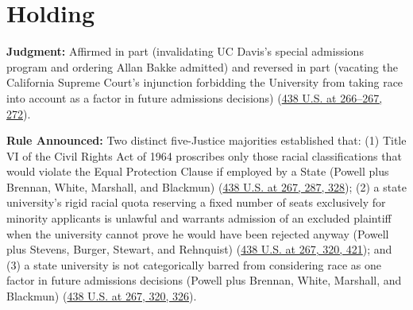 \documentclass[12pt]{article}
\begin{document}
\section{Holding}
\textbf{Judgment:} Affirmed in part (invalidating UC Davis's special admissions program and ordering Allan Bakke admitted) and reversed in part (vacating the California Supreme Court's injunction forbidding the University from taking race into account as a factor in future admissions decisions) (\href{https://supreme.justia.com/cases/federal/us/438/265/}{438 U.S. at 266--267, 272}).

\textbf{Rule Announced:} Two distinct five-Justice majorities established that: (1) Title VI of the Civil Rights Act of 1964 proscribes only those racial classifications that would violate the Equal Protection Clause if employed by a State (Powell plus Brennan, White, Marshall, and Blackmun) (\href{https://supreme.justia.com/cases/federal/us/438/265/}{438 U.S. at 267, 287, 328}); (2) a state university's rigid racial quota reserving a fixed number of seats exclusively for minority applicants is unlawful and warrants admission of an excluded plaintiff when the university cannot prove he would have been rejected anyway (Powell plus Stevens, Burger, Stewart, and Rehnquist) (\href{https://supreme.justia.com/cases/federal/us/438/265/}{438 U.S. at 267, 320, 421}); and (3) a state university is not categorically barred from considering race as one factor in future admissions decisions (Powell plus Brennan, White, Marshall, and Blackmun) (\href{https://supreme.justia.com/cases/federal/us/438/265/}{438 U.S. at 267, 320, 326}).
\end{document}

